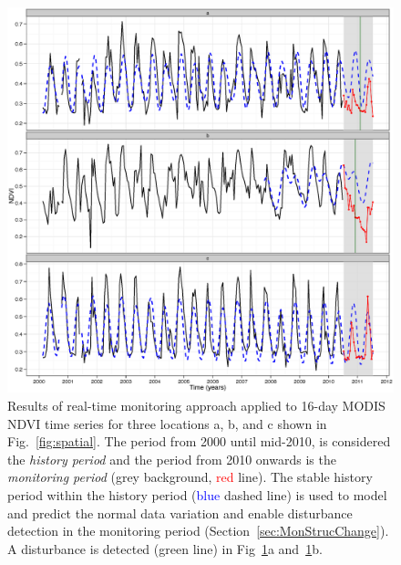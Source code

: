 \documentclass[authoryear,preprint,review,10pt]{elsarticle}
\begin{document}
\begin{figure}[htp]
\centering
    \includegraphics[width=1\textwidth]{figs/Fig6_tsexampleSOM.eps}
  \caption{
 Results of real-time monitoring approach applied to 16-day MODIS NDVI time series for three locations a, b, and c shown in Fig.~\ref{fig:spatial}. The period from 2000 until mid-2010, is considered the \emph{history period} and the period from 2010 onwards is the \emph{monitoring period} (grey background, \textcolor{red} {red} line). The stable history period within the history period (\textcolor{blue} {blue} dashed line) is used to model and predict the normal data variation and enable disturbance detection in the monitoring period (Section~\ref{sec:MonStrucChange}).  A disturbance is detected (\textcolor{OliveGreen} {green} line) in Fig~\ref{fig:realmon}a and~\ref{fig:realmon}b.}
  \label{fig:realmon}
\end{figure}
 
\end{document}
